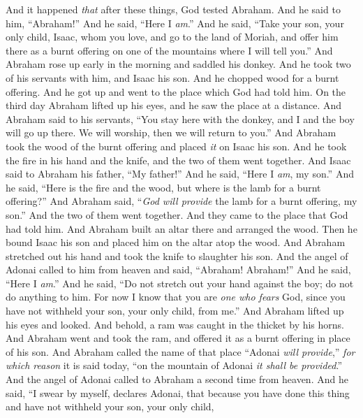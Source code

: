 \begin{biblechapter} %
 And it happened \textit{that} after these things, God tested Abraham. And he said to him, “Abraham!” And he said, “Here I \textit{am}.”
\verse And he said, “Take your son, your only child, Isaac, whom you love, and go to the land of Moriah, and offer him there as a burnt offering on one of the mountains where I will tell you.”
\verse And Abraham rose up early in the morning and saddled his donkey. And he took two of his servants with him, and Isaac his son. And he chopped wood for a burnt offering. And he got up and went to the place which God had told him.
\verse On the third day Abraham lifted up his eyes, and he saw the place at a distance.
\verse And Abraham said to his servants, “You stay here with the donkey, and I and the boy will go up there. We will worship, then we will return to you.”
\verse And Abraham took the wood of the burnt offering and placed \textit{it} on Isaac his son. And he took the fire in his hand and the knife, and the two of them went together.
\verse And Isaac said to Abraham his father, “My father!” And he said, “Here I \textit{am}, my son.” And he said, “Here is the fire and the wood, but where is the lamb for a burnt offering?”
\verse And Abraham said, “\textit{God will provide} the lamb for a burnt offering, my son.” And the two of them went together.
\verse And they came to the place that God had told him. And Abraham built an altar there and arranged the wood. Then he bound Isaac his son and placed him on the altar atop the wood.
\verse And Abraham stretched out his hand and took the knife to slaughter his son.
\verse And the angel of Adonai called to him from heaven and said, “Abraham! Abraham!” And he said, “Here I \textit{am}.”
\verse And he said, “Do not stretch out your hand against the boy; do not do anything to him. For now I know that you are \textit{one who fears} God, since you have not withheld your son, your only child, from me.”
\verse And Abraham lifted up his eyes and looked. And behold, a ram was caught in the thicket by his horns. And Abraham went and took the ram, and offered it as a burnt offering in place of his son.
\verse And Abraham called the name of that place “Adonai \textit{will provide},” \textit{for which reason} it is said today, “on the mountain of Adonai \textit{it shall be provided}.”
\verse And the angel of Adonai called to Abraham a second time from heaven.
\verse And he said, “I swear by myself, declares Adonai, that because you have done this thing and have not withheld your son, your only child,

\end{biblechapter}
